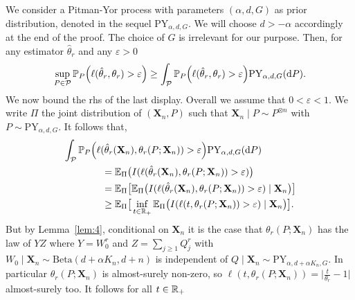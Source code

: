 \documentclass{article}
\newcommand{\1}{\boldsymbol{1}}
\newcommand{\EE}{\mathbb{E}}
\newcommand{\PP}{\mathbb{P}}
\providecommand\given{} %
\theoremstyle{plain}
\begin{document}
We consider a Pitman-Yor process with parameters $(\alpha,d,G)$ as prior distribution, denoted in the sequel $\mathrm{PY}_{\alpha,d,G}$. We will choose $d > -\alpha$ accordingly at the end of the proof. The choice of $G$ is irrelevant for our purpose. Then, for any estimator $\hat{\theta}_r$ and any $\varepsilon > 0$
\begin{align*}
  \sup_{P\in \mathcal{P}}\PP_P\Big( \ell(\hat{\theta}_r,\theta_r) > \varepsilon \Big)%
    \geq \int_{\mathcal{P}}\PP_P\Big( \ell(\hat{\theta}_r,\theta_r) > \varepsilon \Big) \mathrm{PY}_{\alpha,d,G}(\intd P).%
\end{align*}
We now bound the rhs of the last display. Overall we assume that $0 < \varepsilon < 1$. We write $\Pi$ the joint distribution of $(\mathbf{X}_n,P)$ such that $\mathbf{X}_n\mid P \sim P^{\otimes n}$ with $P \sim \mathrm{PY}_{\alpha,d,G}$. It follows that,
\begin{align}
  \notag
  &\int_{\mathcal{P}}\PP_P\Big(\ell(\hat{\theta}_r(\mathbf{X}_n),\theta_r(P;\mathbf{X}_n)) > \varepsilon \Big) \mathrm{PY}_{\alpha,d,G}(\intd P)\\%
  \notag
  &\qquad\qquad= \EE_{\Pi}\big(I( \ell(\hat{\theta}_r(\mathbf{X}_n),\theta_r(P;\mathbf{X}_n)) > \varepsilon )\big)\\
  \notag
  &\qquad\qquad= \EE_{\Pi}\big[ \EE_{\Pi}\big(I(  \ell(\hat{\theta}_r(\mathbf{X}_n),\theta_r(P;\mathbf{X}_n)) > \varepsilon ) \mid \mathbf{X}_n\big) \big]\\
  \label{eq:11}
  &\qquad\qquad\geq \EE_{\Pi}\big[ \inf_{t \in \NNReals} \EE_{\Pi}\big(I(  \ell(t,\theta_r(P;\mathbf{X}_n)) > \varepsilon ) \mid \mathbf{X}_n\big) \big].
\end{align}
But by Lemma~\ref{lem:4}, conditional on $\mathbf{X}_n$ it is the case that
$\theta_r(P;\mathbf{X}_n)$ has the law of $YZ$ where $Y = W_0^{r}$ and
$Z = \sum_{j\geq 1}Q_j^r$ with
$W_0 \mid \mathbf{X}_n \sim\mathrm{Beta}(d + \alpha K_n, d + n)$
is independent of
$Q \mid \mathbf{X}_n \sim \mathrm{PY}_{\alpha,d+\alpha K_n,G}$. In particular $\theta_r(P;\mathbf{X}_n)$ is almost-surely non-zero, so $\ell(t,\theta_r(P;\mathbf{X}_n)) = \big|\frac{t}{\theta_r} -1 \big|$ almost-surely too. It follows for all $t \in \mathbb{R}_{+}$
\end{document}
